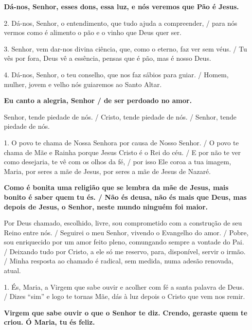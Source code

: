 \documentclass[a5paper,9pt]{extarticle}
\begin{document}
\begin{cantos}
\begin{canto}
\textbf{Dá-nos, Senhor, esses dons, essa luz, e nós veremos que Pão é Jesus.}

2. Dá-nos, Senhor, o entendimento, que tudo ajuda a compreender, / para nós vermos como é alimento o pão e o vinho que Deus quer ser.

3. Senhor, vem dar-nos divina ciência, que, como o eterno, faz ver sem véus. / Tu vês por fora, Deus vê a essência, pensas que é pão, mas é nosso Deus.

4. Dá-nos, Senhor, o teu conselho, que nos faz sábios para guiar. / Homem, mulher, jovem e velho nós guiaremos ao Santo Altar.
\end{canto}

\begin{canto}
\textbf{Eu canto a alegria, Senhor / de ser perdoado no amor. }

Senhor, tende piedade de nós.  / Cristo, tende piedade de nós.  / 
Senhor, tende piedade de nós. 
\end{canto}

\begin{canto}
1. O povo te chama de Nossa Senhora por causa de Nosso Senhor. / O povo te chama de Mãe e Rainha porque Jesus Cristo é o Rei do céu. / E por não te ver como desejaria, te vê com os olhos da fé, / por isso Ele coroa a tua imagem, Maria, por seres a mãe de Jesus, por seres a mãe de Jesus de Nazaré.

\textbf{Como é bonita uma religião que se lembra da mãe de Jesus, mais bonito é saber quem tu és. / Não és deusa, não és mais que Deus, mas depois de Jesus, o Senhor, neste mundo ninguém foi maior.}
\end{canto}

\begin{canto}
Por Deus chamado, escolhido, livre, sou comprometido com a construção de seu Reino entre nós. / Seguirei o meu Senhor, vivendo o Evangelho do amor. / Pobre, sou enriquecido por um amor feito pleno, comungando sempre a vontade do Pai. / Deixando tudo por Cristo, a ele só me reservo, para, disponível, servir o irmão. / Minha resposta ao chamado é radical, sem medida, numa adesão renovada, atual.
\end{canto}

\begin{canto}
1. És, Maria, a Virgem que sabe ouvir e acolher com fé a santa palavra de Deus. / Dizes ``sim'' e logo te tornas Mãe, dás à luz depois o Cristo que vem nos remir.

\textbf{Virgem que sabe ouvir o que o Senhor te diz. Crendo, geraste quem te criou. Ó Maria, tu és feliz. }
\end{canto}


\end{cantos}
\end{document}
